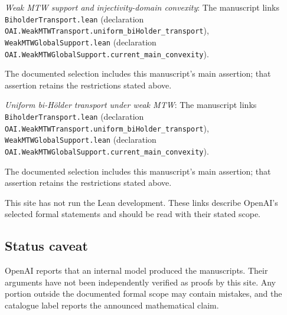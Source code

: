 \documentclass[11pt]{article}
\begin{document}
\textit{Weak MTW support and injectivity-domain convexity}: The manuscript links \texttt{BiholderTransport.lean} (declaration \texttt{OAI.WeakMTWTransport.uniform\_biHolder\_transport}), \texttt{WeakMTWGlobalSupport.lean} (declaration \texttt{OAI.WeakMTWGlobalSupport.current\_main\_convexity}).

The documented selection includes this manuscript’s main assertion; that assertion retains the restrictions stated above.

\textit{Uniform bi-Hölder transport under weak MTW}: The manuscript links \texttt{BiholderTransport.lean} (declaration \texttt{OAI.WeakMTWTransport.uniform\_biHolder\_transport}), \texttt{WeakMTWGlobalSupport.lean} (declaration \texttt{OAI.WeakMTWGlobalSupport.current\_main\_convexity}).

The documented selection includes this manuscript’s main assertion; that assertion retains the restrictions stated above.

This site has not run the Lean development. These links describe OpenAI’s selected formal statements and should be read with their stated scope.

\subsection{Status caveat}
OpenAI reports that an internal model produced the manuscripts. Their arguments have not been independently verified as proofs by this site. Any portion outside the documented formal scope may contain mistakes, and the catalogue label reports the announced mathematical claim.
\end{document}
